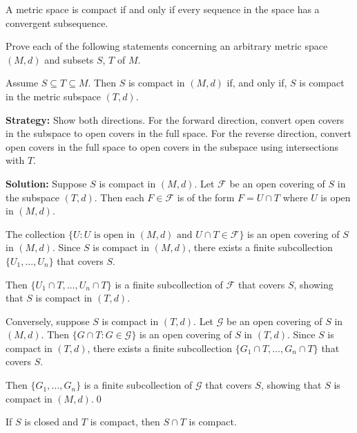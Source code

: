 \begin{theorem}
A metric space is compact if and only if every sequence in the space has a convergent subsequence.
\end{theorem}

Prove each of the following statements concerning an arbitrary metric space $(M,d)$ and subsets $S$, $T$ of $M$.



\begin{problembox}
Assume \( S \subseteq T \subseteq M \). Then \( S \) is compact in \((M, d)\) if, and only if, \( S \) is compact in the metric subspace \((T, d)\).
\end{problembox}

\noindent\textbf{Strategy:} Show both directions. For the forward direction, convert open covers in the subspace to open covers in the full space. For the reverse direction, convert open covers in the full space to open covers in the subspace using intersections with $T$.

\bigskip\noindent\textbf{Solution:} Suppose $S$ is compact in $(M,d)$. Let $\mathcal{F}$ be an open covering of $S$ in the subspace $(T,d)$. Then each $F \in \mathcal{F}$ is of the form $F = U \cap T$ where $U$ is open in $(M,d)$.

The collection $\{U : U \text{ is open in } (M,d) \text{ and } U \cap T \in \mathcal{F}\}$ is an open covering of $S$ in $(M,d)$. Since $S$ is compact in $(M,d)$, there exists a finite subcollection $\{U_1, \ldots, U_n\}$ that covers $S$.

Then $\{U_1 \cap T, \ldots, U_n \cap T\}$ is a finite subcollection of $\mathcal{F}$ that covers $S$, showing that $S$ is compact in $(T,d)$.

Conversely, suppose $S$ is compact in $(T,d)$. Let $\mathcal{G}$ be an open covering of $S$ in $(M,d)$. Then $\{G \cap T : G \in \mathcal{G}\}$ is an open covering of $S$ in $(T,d)$. Since $S$ is compact in $(T,d)$, there exists a finite subcollection $\{G_1 \cap T, \ldots, G_n \cap T\}$ that covers $S$.

Then $\{G_1, \ldots, G_n\}$ is a finite subcollection of $\mathcal{G}$ that covers $S$, showing that $S$ is compact in $(M,d)$.\qed


\begin{problembox}
If \( S \) is closed and \( T \) is compact, then \( S \cap T \) is compact.
\end{problembox}

